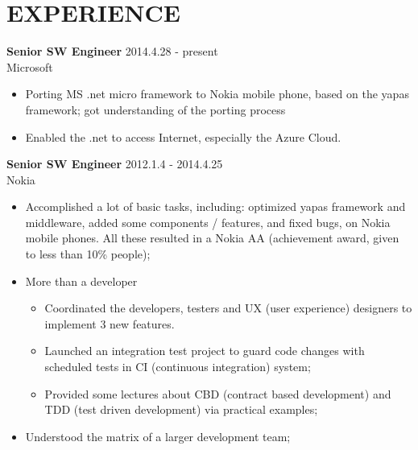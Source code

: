 
\section{EXPERIENCE}
\textbf{Senior SW Engineer} \hfill 2014.4.28 - present\\
        Microsoft
        \begin{itemize}  \itemsep -2pt %
                \item Porting MS .net micro framework to Nokia mobile phone, based on the yapas framework; got understanding of the porting process
                \item Enabled the .net to access Internet, especially the Azure Cloud.
        \end{itemize}

\textbf{Senior SW Engineer} \hfill 2012.1.4 - 2014.4.25\\
        Nokia
        \begin{itemize}  \itemsep -2pt %
        \item Accomplished a lot of basic tasks, including:
            optimized yapas framework and middleware, added some components / features, and fixed bugs,
        on Nokia mobile phones.
        All these resulted in a Nokia AA (achievement award, given to less than 10\% people);
        \item More than a developer 
            \begin{itemize}  \itemsep -2pt
                \item Coordinated the developers, testers and UX (user experience) designers to implement 3 new features.
                \item Launched an integration test project to guard code changes
                with scheduled tests in CI (continuous integration) system;
                \item Provided some lectures about CBD (contract based development) and
                TDD (test driven development) via practical examples;
            \end{itemize}
        \item Understood the matrix of a larger development team;
        \end{itemize}

